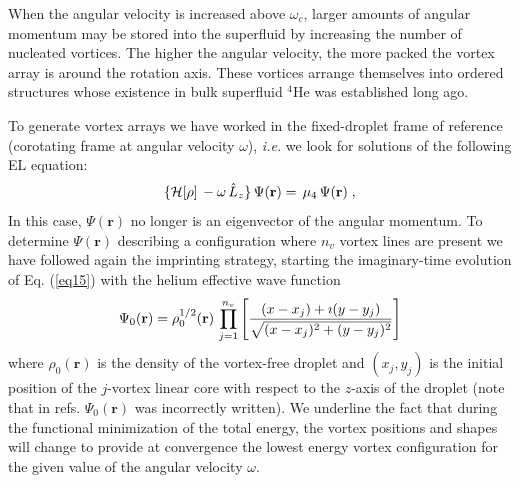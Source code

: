 When the angular velocity is increased 
above $\omega_c$, larger amounts of angular momentum may be stored
into the superfluid by increasing the number of 
nucleated vortices. The higher the angular velocity,  
the more packed the vortex array is
around the rotation axis.  
These vortices arrange themselves into ordered structures  
whose existence in bulk superfluid $^4$He was established long  ago.\citep{Vin61,Wil74}

To generate vortex arrays we have worked in the  
fixed-droplet frame of reference (corotating frame at  
angular velocity $\omega$), {\it i.e.} we look for solutions of the following EL equation: 
%
\begin{equation}
\{{\cal H}[\rho] \,-\omega \,\hat{L}_z\} \,\Psi(\mathbf{r})  =  \,\mu_4 \,
\Psi(\mathbf{r}) \;,
\label{eq15}
\end{equation}
%
In this case, $\Psi(\mathbf{r})$ no longer is  
an eigenvector of the angular momentum.
To determine $\Psi(\mathbf{r})$ describing a 
configuration where $n_v$ vortex lines are present we have followed 
again the imprinting strategy, starting the imaginary-time evolution of  
Eq. (\ref{eq15}) with the helium effective wave function
%
\begin{equation}
\Psi_0(\mathbf{r})=\rho_0^{1/2}(\mathbf{r})\, \prod _{j=1}^{n_v} \left[ {(x-x_j)+\imath (y-y_j) \over \sqrt{(x-x_j)^2+(y-y_j)^2}}  \right] 
\label{eq16}
\end{equation}
%
where  $\rho_0(\mathbf{r})$ is the density of the vortex-free 
droplet and $(x_j, y_j)$ is the initial position of the $j$-vortex linear  core with
respect to the $z$-axis of the droplet (note that in refs. \citep{Anc14,Anc15}  
$\Psi_0(\mathbf{r})$ was incorrectly written).
We underline the fact that during the functional minimization 
of the total energy, the vortex positions and shapes will change
to provide at convergence the lowest energy vortex 
configuration for the given value of the angular velocity $\omega$.  

